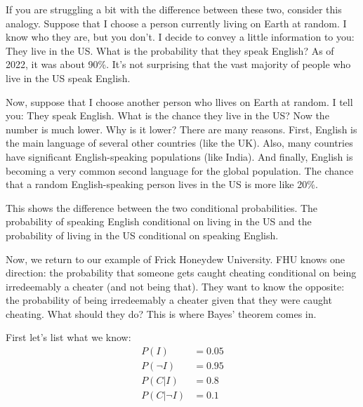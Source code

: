 If you are struggling a bit with the difference between these two, consider this analogy.  Suppose that I choose a person currently living on Earth at random.  I know who they are, but you don't.  I decide to convey a little information to you: They live in the US.  What is the probability that they speak English? As of 2022, it was about 90\%. It's not surprising that the vast majority of people who live in the US speak English. 

Now, suppose that I choose another person who llives on Earth at random. I tell you: They speak English.  What is the chance they live in the US? Now the number is much lower.  Why is it lower? There are many reasons.  First, English is the main language of several other countries (like the UK). Also, many countries have significant English-speaking populations (like India). And finally, English is becoming a very common second language for the global population.  The chance that a random English-speaking person lives in the US is more like 20\%. 

This shows the difference between the two conditional probabilities. The probability of speaking English conditional on living in the US and the probability of living in the US conditional on speaking English.

Now, we return to our example of Frick Honeydew University. FHU knows one direction: the probability that someone gets caught cheating conditional on being irredeemably a cheater (and not being that).  They want to know the opposite: the probability of being irredeemably a cheater given that they were caught cheating.  What should they do?  This is where Bayes' theorem comes in.

First let's list what we know:
\begin{align*}
    P(I) & = 0.05\\
    P(\neg I) &= 0.95\\
    P(C|I)  & = 0.8\\
    P(C| \neg I) &= 0.1
\end{align*}

